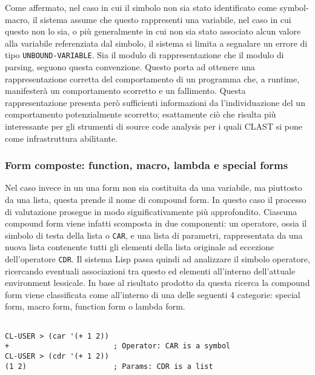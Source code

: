 Come affermato, nel caso in cui il simbolo non sia stato identificato come
symbol-macro, il sistema assume che questo rappresenti una variabile, nel
caso in cui questo non lo sia, o più generalmente in cui non sia stato
associato alcun valore alla variabile referenziata dal simbolo, il sistema si
limita a segnalare un errore di tipo \texttt{UNBOUND-VARIABLE}. Sia il modulo
di rappresentazione che il modulo di parsing, seguono questa convenzione.
Questo porta ad ottenere una rappresentazione corretta del comportamento di un
programma che, a runtime, manifesterà un comportamento scorretto e un
fallimento. Questa rappresentazione presenta però sufficienti informazioni da
l’individuazione del un comportamento potenzialmente scorretto; esattamente
ciò che risulta più interessante per gli strumenti di source code analysis per
i quali CLAST si pone come infrastruttura abilitante.\\

\subsubsection{Form composte: function, macro, lambda e special forms}

Nel caso invece in un una form non sia costituita da una variabile, ma
piuttosto da una lista, questa prende il nome di compound form. In questo caso
il processo di valutazione prosegue in modo significativamente più
approfondito. Ciascuna compound form viene infatti scomposta in due
componenti: un operatore, ossia il simbolo di testa della lista o
\texttt{CAR}, e una lista di parametri, rappresentata da una nuova lista
contenente tutti gli elementi della lista originale ad eccezione
dell’operatore \texttt{CDR}. Il sistema Lisp passa quindi ad analizzare il
simbolo operatore, ricercando eventuali associazioni tra questo ed elementi
all’interno dell’attuale environment lessicale. In base al risultato prodotto
da questa ricerca la compound form viene classificata come all’interno di una
delle seguenti 4 categorie: special form, macro form, function form o lambda
form.

\begin{lstlisting}[caption=Esempio di estrazione degli elementi operatore e
parametri di una compound form]

CL-USER > (car '(+ 1 2))
+                        ; Operator: CAR is a symbol
CL-USER > (cdr '(+ 1 2))
(1 2)                    ; Params: CDR is a list

\end{lstlisting}

